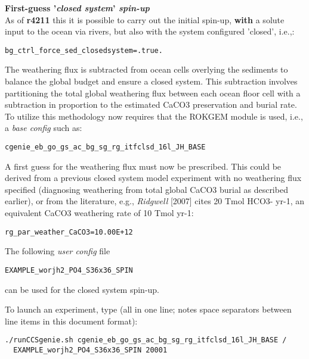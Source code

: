 \documentclass[10pt,twoside]{article}
\begin{document}
\begin{compactenum}

        \item \textbf{First-guess '\textit{closed system}' \textit{spin-up}}
        \\As of \textbf{r4211} this it is possible to carry out the initial spin-up, \textbf{with} a solute input to the ocean via rivers, but also with the system configured 'closed', i.e.,:
\vspace{-5pt}\begin{verbatim}bg_ctrl_force_sed_closedsystem=.true.\end{verbatim}\vspace{-5pt}
The weathering flux is subtracted from ocean cells overlying the sediments to balance the global budget and ensure a closed system. This subtraction involves partitioning the total global weathering flux between each ocean floor cell with a subtraction in proportion to the estimated CaCO3 preservation and burial rate. To utilize this methodology now requires that the ROKGEM module is used, i.e., a \textit{base config} such as:
\vspace{-5pt}\begin{verbatim}cgenie_eb_go_gs_ac_bg_sg_rg_itfclsd_16l_JH_BASE\end{verbatim}\vspace{-5pt}
A first guess for the weathering flux must now be prescribed. This could be derived from a previous closed system model experiment with no weathering flux specified (diagnosing weathering from total global CaCO3 burial as described earlier), or from the literature, e.g., \textit{Ridgwell} [2007] cites 20 Tmol HCO3- yr-1, an equivalent CaCO3 weathering rate of 10 Tmol yr-1:
\vspace{-5pt}\begin{verbatim}rg_par_weather_CaCO3=10.00E+12\end{verbatim}\vspace{-5pt}

The following \textit{user config} file 
\vspace{-5pt}\begin{verbatim}EXAMPLE_worjh2_PO4_S36x36_SPIN\end{verbatim}\vspace{-5pt}
can be used for the closed system spin-up.

\noindent To launch an experiment, type (all in one line; notes space separators between line items in this document format):
\vspace{-5pt}\begin{verbatim}
./runCCSgenie.sh cgenie_eb_go_gs_ac_bg_sg_rg_itfclsd_16l_JH_BASE /
  EXAMPLE_worjh2_PO4_S36x36_SPIN 20001
\end{verbatim}\vspace{-5pt}


\end{compactenum}
\end{document}
